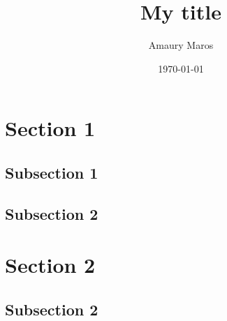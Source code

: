 \documentclass{article}
\title{My title}
\author{Amaury Maros}
\date{\today}
\begin{document}
\maketitle

\tableofcontents

\newpage
\section{Section 1}

\subsection{Subsection 1}

\subsection{Subsection 2}

\section{Section 2}

\subsection{Subsection 2}
\end{document}
